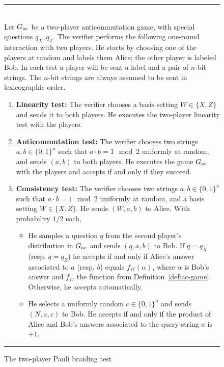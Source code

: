 \documentclass[11pt,letterpaper]{article}
\newcommand{\<}{\langle}
\renewcommand{\>}{\rangle}
\newcommand{\ac}{{\ensuremath{\rm ac}}}
\begin{document}
\begin{figure}[H]
\rule[1ex]{16.5cm}{0.5pt}\\
Let $G_\ac$ be a two-player anticommutation game, with special questions $q_X,q_Z$. 
The verifier performs the following one-round interaction with two
players. He starts by choosing one of the players at random and
labels them Alice; the other player is labeled Bob. In each test a player will be sent a label and a pair of $n$-bit strings. The $n$-bit strings are always assumed to be sent in lexicographic order.  
\begin{enumerate}
\item {\bf Linearity test:} The verifier chooses a basis setting $W \in
  \{X,Z\}$ and sends it to both players. He executes the two-player linearity test with the players.
\item {\bf Anticommutation test:} The verifier chooses two strings $a,b\in\{0,1\}^n$ such that $a\cdot b=1\mod2$ uniformly at random, and sends $(a,b)$ to both players. He executes the game $G_\ac$ with the players and accepts if and only if they succeed. 
\item {\bf Consistency test:} The verifier  chooses two strings
  $a,b\in\{0,1\}^n$ such that $a\cdot b=1\mod2$ uniformly at random, and a basis
  setting $W\in\{X,Z\}$. He sends $(W,a,b)$ to Alice. With probability $1/2$ each, 
\begin{itemize}
\item He samples a question $q$ from the second player's distribution in
  $G_\ac$ and sends $(q,a,b)$ to Bob. If $q=q_X$ (resp. $q=q_Z$) he accepts if and
  only if Alice's answer associated to $a$ (resp. $b$) equals $f_W(\alpha)$, where
  $\alpha$ is Bob's answer and $f_W$ the function from
  Definition~\ref{def:ac-game}. Otherwise, he accepts
  automatically. 
\item He selects a uniformly random $c\in\{0,1\}^n$ and sends $(N,a,c)$ to Bob. He accepts if and only if the product of Alice and Bob's answers associated to the query string $a$ is $+1$. 
\end{itemize}
\end{enumerate}
\rule[1ex]{16.5cm}{0.5pt}
\caption{The two-player Pauli braiding test}
\label{fig:protocol2player}
\end{figure}
\end{document}
